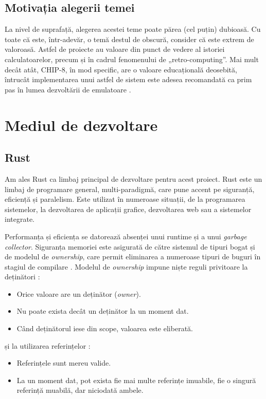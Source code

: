 \documentclass[a4paper]{article}
\begin{document}
\subsection{Motivația alegerii temei}
La nivel de suprafață, alegerea acestei teme poate părea (cel puțin) dubioasă. Cu toate că este, într-adevăr, o temă destul de obscură, consider
că este extrem de valoroasă. Astfel de proiecte au valoare din punct de vedere al istoriei calculatoarelor, precum și în cadrul fenomenului de
„retro-computing”. Mai mult decât atât, CHIP-8, în mod specific, are o valoare educațională deosebită, întrucât implementarea unui astfel de
sistem este adesea recomandată ca prim pas în lumea dezvoltării de emulatoare \cite{langhoff}.

\section{Mediul de dezvoltare}
\subsection{Rust}
Am ales Rust ca limbaj principal de dezvoltare pentru acest proiect. Rust este un limbaj de programare general, multi-paradigmă, care pune accent
pe siguranță, eficiență și paralelism. Este utilizat în numeroase situații, de la programarea sistemelor, la dezvoltarea de aplicații grafice, dezvoltarea
web sau a sistemelor integrate.

Performanța și eficiența se datorează absenței unui runtime și a unui \textit{garbage collector}. Siguranța memoriei este asigurată de către sistemul
de tipuri bogat și de modelul de \textit{ownership}, care permit eliminarea a numeroase tipuri de buguri în stagiul de compilare \cite{rsorg}. Modelul
de \textit{ownership} impune niște reguli privitoare la deținători \cite[Cap.~4.1]{rustbook}:
\begin{itemize}
	\item Orice valoare are un deținător (\textit{owner}).
	\item Nu poate exista decât un deținător la un moment dat.
	\item Când deținătorul iese din scope, valoarea este eliberată.
\end{itemize}
și la utilizarea referințelor \cite[Cap.~4.2]{rustbook}:
\begin{itemize}
	\item Referințele sunt mereu valide.
	\item La un moment dat, pot exista fie mai multe referințe imuabile, fie o singură referință muabilă, dar niciodată ambele.
\end{itemize}
\end{document}
